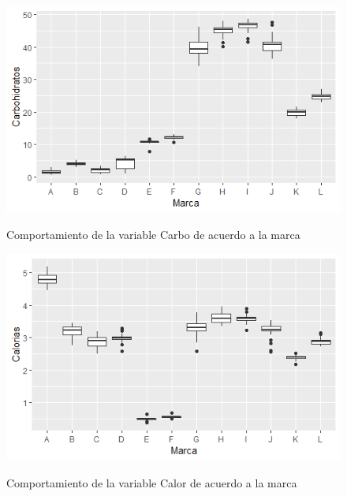 \documentclass[pdf]{beamer}
\begin{document}
\begin{frame}
\begin{figure}[h]
\centering
\includegraphics[scale=1]{images/carbo.png} 
\label{i8}
\caption{Comportamiento de la variable Carbo de acuerdo a la marca}
\end{figure}
\end{frame}


\begin{frame}
\begin{figure}[h]
\centering
\includegraphics[scale=1]{images/calor.png} 
\label{i9}
\caption{Comportamiento de la variable Calor de acuerdo a la marca}
\end{figure}
\end{frame}
\end{document}
